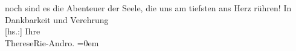 \begin{ledgroupsized}[t]{13cm}
               noch sind es die Abenteuer der Seele, die uns am tiefsten ans Herz rühren!\pend
           \pstart
           In Dankbarkeit und Verehrung{\\[\baselineskip]}{[}hs.:{]} Ihre{\\[\baselineskip]}\spacefill\mbox{ThereseRie-Andro.}\pend
           \leftskip=0em{}\endnumbering{}\end{ledgroupsized}  \newcommand{\dateiname}{L02567}\newcommand{\titel}{Therese Rie-Andro an Arthur Schnitzler, 22. 12. 1929}\newcommand{\editorInnen}{Martin Anton Müller und Gerd-Hermann Susen}
      